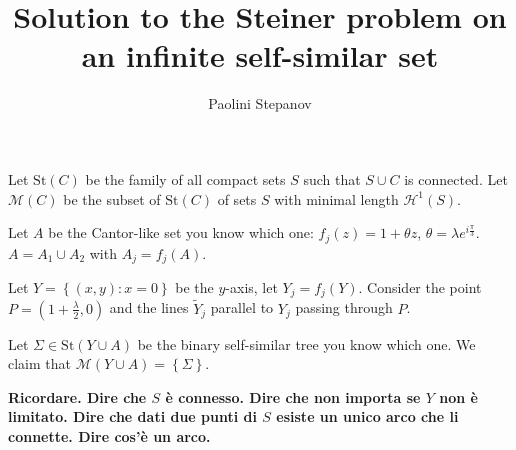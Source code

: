 \documentclass{article}
\title{Solution to the Steiner problem on an infinite self-similar set}
\author{Paolini Stepanov}
\renewcommand{\H}{\mathcal H}
\newcommand{\ENCLOSE}[1]{\left\{#1\right\}}
\newcommand{\St}{\mathrm{St}}
\newcommand{\M}{\mathcal{M}}
\renewcommand{\H}{\mathcal{H}}
\theoremstyle{definition}
\theoremstyle{remark}
\begin{document}
\maketitle
Let $\St(C)$ be the family of all compact sets $S$ such that 
$S\cup C$ is connected.
Let $\M(C)$ be the subset of $\St(C)$ of sets $S$ 
with minimal length $\H^1(S)$.

Let $A$ be the Cantor-like set you know which one: 
$f_j(z) = 1 + \theta z$,
$\theta = \lambda e^{i \frac \pi 3}$.
$A=A_1\cup A_2$ 
with $A_j = f_j(A)$.

Let $Y=\ENCLOSE{(x,y)\colon x=0}$ be the $y$-axis,
let $Y_j = f_j(Y)$.
Consider the point $P=(1+\frac\lambda 2,0)$ 
and the lines $\tilde Y_j$ parallel to $Y_j$ 
passing through $P$.

Let $\Sigma\in \St(Y\cup A)$ be the binary self-similar 
tree you know which one.
We claim that $\M(Y\cup A)=\ENCLOSE{\Sigma}$.

\textbf{Ricordare. Dire che $S$ è connesso. 
Dire che non importa se $Y$ non è limitato.
Dire che dati due punti di $S$ esiste un unico arco che li connette.
Dire cos'è un arco. }
\end{document}
